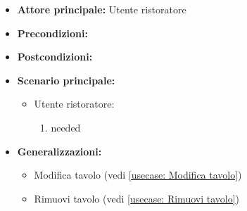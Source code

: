 \label{usecase:Dettaglio tavolo}
\begin{itemize}
\item \textbf{Attore principale:}  Utente ristoratore
\item \textbf{Precondizioni:}
\item \textbf{Postcondizioni:}
\item \textbf{Scenario principale:}
\begin{itemize}
\item  Utente ristoratore:
\begin{enumerate}
\item needed
\end{enumerate}
\end{itemize}
\item \textbf{Generalizzazioni:}
\begin{itemize}
\item  Modifica tavolo (vedi \autoref{usecase: Modifica tavolo})
\item  Rimuovi tavolo (vedi \autoref{usecase: Rimuovi tavolo})
\end{itemize}
\end{itemize}